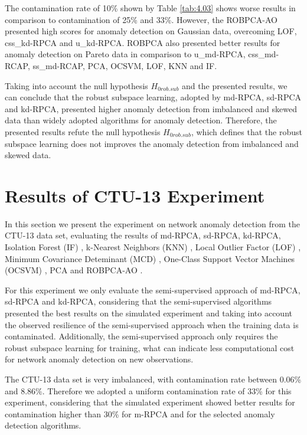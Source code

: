 The contamination rate of 10\% shown by Table \ref{tab:4.03} shows worse results in comparison to contamination of 25\% and 33\%. However, the ROBPCA-AO presented high scores for anomaly detection on Gaussian data, overcoming LOF, css\_kd-RPCA and u\_kd-RPCA. ROBPCA also presented better results for anomaly detection on Pareto data in comparison to u\_md-RPCA, css\_md-RCAP, ss\_md-RCAP, PCA, OCSVM, LOF, KNN and IF.

Taking into account the null hypothesis $H_{0rob.sub}$ and the presented results, we can conclude that the robust subspace learning, adopted by md-RPCA, sd-RPCA and kd-RPCA, presented higher anomaly detection from imbalanced and skewed data than widely adopted algorithms for anomaly detection. Therefore, the presented results refute the null hypothesis $H_{0rob.sub}$, which defines that the robust subspace learning does not improves the anomaly detection from imbalanced and skewed data.

\section{Results of CTU-13 Experiment}
\label{sec:4_ctu13_result}

In this section we present the experiment on network anomaly detection from the CTU-13 data set, evaluating the results of md-RPCA, sd-RPCA, kd-RPCA, Isolation Forest (IF) \cite{liu2008isolation}, k-Nearest Neighbors (KNN) \cite{angiulli2002fast}, Local Outlier Factor (LOF) \cite{breunig2000lof}, Minimum Covariance Deteminant (MCD) \cite{rousseeuw1999fastmcd}, One-Class Support Vector Machines (OCSVM) \cite{scholkopf2001estimating}, PCA \cite{shyu2003novel} and ROBPCA-AO \cite{hubert2009robustskewed}.

For this experiment we only evaluate the semi-supervised approach of md-RPCA, sd-RPCA and kd-RPCA, considering that the semi-supervised algorithms presented the best results on the simulated experiment and taking into account the observed resilience of the semi-supervised approach when the training data is contaminated. Additionally, the semi-supervised approach only requires the robust subspace learning for training, what can indicate less computational cost for network anomaly detection on new observations.

The CTU-13 data set is very imbalanced, with contamination rate between 0.06\% and 8.86\%. Therefore we adopted a uniform contamination rate of 33\% for this experiment, considering that the simulated experiment showed better results for contamination higher than 30\% for m-RPCA and for the selected anomaly detection algorithms.

